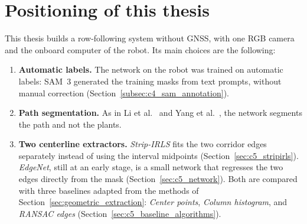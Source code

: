 \section{Positioning of this thesis}
\label{sec:thesis_positioning}

This thesis builds a row-following system without GNSS, with one RGB
camera and the onboard computer of the robot. Its main choices are the
following:

\begin{enumerate}
    \item \textbf{Automatic labels.} The network on the robot was trained on
    automatic labels: SAM~3 generated the training masks from text prompts,
    without manual correction (Section~\ref{subsec:c4_sam_annotation}).

    \item \textbf{Path segmentation.} As in Li et al.~\cite{li2022multiroi}
    and Yang et al.~\cite{yang2022orchard}, the network segments the path
    and not the plants.

    \item \textbf{Two centerline extractors.} \textit{Strip-IRLS} fits the two corridor edges separately instead of
    using the interval midpoints
    (Section~\ref{sec:c5_stripirls}). \textit{EdgeNet}, still at an
    early stage, is a small network that regresses the two edges directly
    from the mask (Section~\ref{sec:c5_network}). Both are compared with
    three baselines adapted from the methods of
    Section~\ref{sec:geometric_extraction}: \textit{Center points},
    \textit{Column histogram}, and \textit{RANSAC edges}
    (Section~\ref{sec:c5_baseline_algorithms}).
\end{enumerate}
